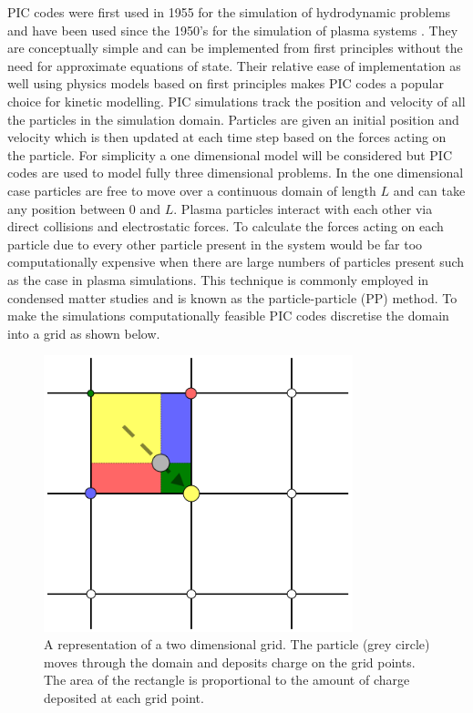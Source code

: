 \documentclass[12pt]{article}
\begin{document}
PIC codes were first used in 1955 for the simulation of hydrodynamic problems and have been used since the 1950's for the simulation of plasma systems \cite{Harlow}. They are conceptually simple and can be implemented from first principles without the need for approximate equations of state. Their relative ease of implementation as well using physics models based on first principles makes PIC codes a popular choice for kinetic modelling. PIC simulations track the position and velocity of all the particles in the simulation domain. Particles are given an initial position and velocity which is then updated at each time step based on the forces acting on the particle. For simplicity a one dimensional model will be considered but PIC codes are used to model fully three dimensional problems. In the one dimensional case particles are free to move over a continuous domain of length $L$ and can take any position between 0 and $L$. Plasma particles interact with each other via direct collisions and electrostatic forces. To calculate the forces acting on each particle due to every other particle present in the system would be far too computationally expensive when there are large numbers of particles present such as the case in plasma simulations. This technique is commonly employed in condensed matter studies and is known as the particle-particle (PP) method. To make the simulations computationally  feasible PIC codes discretise the domain into a grid as shown below.
\begin{figure}[H]
\centering
\includegraphics[width=0.8\textwidth]{grid}
\caption{A representation of a two dimensional grid. The particle (grey circle) moves through the domain and deposits charge on the grid points. The area of the rectangle is proportional to the amount of charge deposited at each grid point.\cite{grid}}
\label{fig:Leapfrog}
\end{figure}
\end{document}
